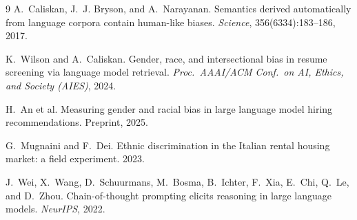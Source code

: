 \documentclass[10pt,twocolumn]{article}
\begin{document}
\begin{thebibliography}{9}
\small
{} A.~Caliskan, J.~J. Bryson, and A.~Narayanan.
Semantics derived automatically from language corpora contain human-like
biases. \emph{Science}, 356(6334):183--186, 2017.

 K.~Wilson and A.~Caliskan. Gender, race, and
intersectional bias in resume screening via language model retrieval.
\emph{Proc.\ AAAI/ACM Conf.\ on AI, Ethics, and Society (AIES)}, 2024.

 H.~An et al. Measuring gender and racial bias in large
language model hiring recommendations. Preprint, 2025.

 G.~Mugnaini and F.~Dei. Ethnic discrimination in
the Italian rental housing market: a field experiment. 2023.

 J.~Wei, X.~Wang, D.~Schuurmans, M.~Bosma, B.~Ichter,
F.~Xia, E.~Chi, Q.~Le, and D.~Zhou. Chain-of-thought prompting elicits
reasoning in large language models. \emph{NeurIPS}, 2022.
\end{thebibliography}
\end{document}
